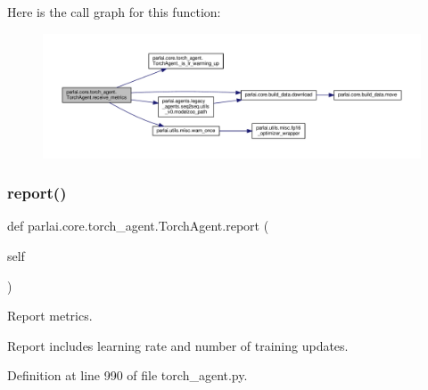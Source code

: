 Here is the call graph for this function\+:
\nopagebreak
\begin{figure}[H]
\begin{center}
\leavevmode
\includegraphics[width=350pt]{classparlai_1_1core_1_1torch__agent_1_1TorchAgent_a02beaaedfa30463f9d0a97ea590b516f_cgraph}
\end{center}
\end{figure}
\mbox{\label{classparlai_1_1core_1_1torch__agent_1_1TorchAgent_ac694770cd4022eb047bf6fbb8f46035c}} 
\subsubsection{\texorpdfstring{report()}{report()}}
{\footnotesize\ttfamily def parlai.\+core.\+torch\+\_\+agent.\+Torch\+Agent.\+report (\begin{DoxyParamCaption}\item[{}]{self }\end{DoxyParamCaption})}

\begin{DoxyVerb}Report metrics.

Report includes learning rate and number of training updates.
\end{DoxyVerb}
 

Definition at line 990 of file torch\+\_\+agent.\+py.



